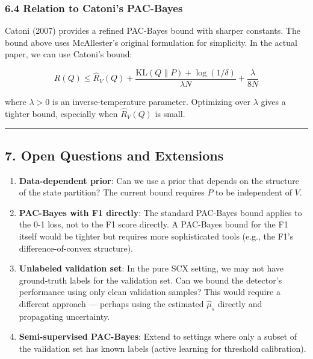 \documentclass[
  12pt,
]{ctexart}
\begin{document}
\subsubsection{6.4 Relation to Catoni's
PAC-Bayes}\label{relation-to-catonis-pac-bayes}

Catoni (2007) provides a refined PAC-Bayes bound with sharper constants.
The bound above uses McAllester's original formulation for simplicity.
In the actual paper, we can use Catoni's bound:

\[R(Q) \leq \hat{R}_V(Q) + \frac{\text{KL}(Q \parallel P) + \log(1/\delta)}{\lambda N} + \frac{\lambda}{8N}\]

where \(\lambda > 0\) is an inverse-temperature parameter. Optimizing
over \(\lambda\) gives a tighter bound, especially when \(\hat{R}_V(Q)\)
is small.

\begin{center}\rule{0.5\linewidth}{0.5pt}\end{center}

\subsection{7. Open Questions and
Extensions}\label{open-questions-and-extensions}

\begin{enumerate}
\def\labelenumi{\arabic{enumi}.}
\item
  \textbf{Data-dependent prior}: Can we use a prior that depends on the
  structure of the state partition? The current bound requires \(P\) to
  be independent of \(V\).
\item
  \textbf{PAC-Bayes with F1 directly}: The standard PAC-Bayes bound
  applies to the 0-1 loss, not to the F1 score directly. A PAC-Bayes
  bound for the F1 itself would be tighter but requires more
  sophisticated tools (e.g., the F1's difference-of-convex structure).
\item
  \textbf{Unlabeled validation set}: In the pure SCX setting, we may not
  have ground-truth labels for the validation set. Can we bound the
  detector's performance using only clean validation samples? This would
  require a different approach --- perhaps using the estimated
  \(\hat{\mu}_s\) directly and propagating uncertainty.
\item
  \textbf{Semi-supervised PAC-Bayes}: Extend to settings where only a
  subset of the validation set has known labels (active learning for
  threshold calibration).
\end{enumerate}
\end{document}
